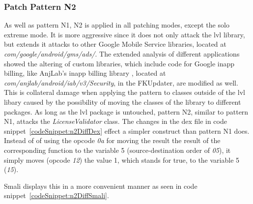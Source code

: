 \subsubsection{Patch Pattern N2}
As well as pattern N1, N2 is applied in all patching modes, except the solo extreme mode.
It is more aggressive since it does not only attack the \gls{lvl} library, but extends it attacks to other Google Mobile Service libraries, located at \textit{com/google/android/gms/ads/}.
The extended analysis of different applications showed the altering of custom libraries, which include code for Google inapp billing, like AnjLab's inapp billing library \cite{inappBilling}, located at \textit{com/anjlab/android/iab/v3/Security}, in the FKUpdater, are modified as well.
This is collateral damage when applying the pattern to classes outside of the \gls{lvl} libary caused by the possibility of moving the classes of the library to different packages.
As long as the \gls{lvl} package is untouched, pattern N2, similar to pattern N1, attacks the \textit{LicenseValidator} class.
\newline
The changes in the \gls{dex} file in code snippet~\ref{codeSnippet:n2DiffDex} effect a simpler construct than pattern N1 does.
Instead of of using the opcode \textit{0a} for moving the result the result of the corresponding function to the variable 5 (source-destination order of \textit{05}), it simply moves (opcode \textit{12}) the value 1, which stands for true, to the variable 5 (\textit{15}).
\newline


Smali displays this in a more convenient manner as seen in code snippet~\ref{codeSnippet:n2DiffSmali}.
\newline


